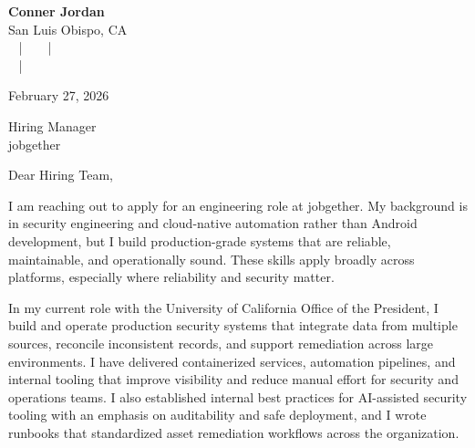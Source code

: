 \documentclass[letterpaper,11pt]{article}
\newcommand{\companyname}{jobgether}
\begin{document}
\begin{center}
  {\Huge \textbf{Conner Jordan}}\\[4pt]
  {\Large San Luis Obispo, CA}\\[4pt]
  \href{tel:+18059759793}{
    } ~ | ~
  \href{mailto:connercharlesjordan@gmail.com}{
    } ~ | ~
   \\
  \href{https://www.linkedin.com/in/conner-jordan-4b268514a/}{
    } ~ | ~
  \href{https://github.com/cjordan223}{
    }
\end{center}

\vspace{16pt}

\begin{flushright}
February 27, 2026
\end{flushright}

Hiring Manager\\
\companyname

\vspace{26pt}

\noindent
Dear Hiring Team,

\vspace{16pt}

I am reaching out to apply for an engineering role at \companyname. My background is in security engineering and cloud-native automation rather than Android development, but I build production-grade systems that are reliable, maintainable, and operationally sound. These skills apply broadly across platforms, especially where reliability and security matter.

\vspace{16pt}

In my current role with the University of California Office of the President, I build and operate production security systems that integrate data from multiple sources, reconcile inconsistent records, and support remediation across large environments. I have delivered containerized services, automation pipelines, and internal tooling that improve visibility and reduce manual effort for security and operations teams. I also established internal best practices for AI-assisted security tooling with an emphasis on auditability and safe deployment, and I wrote runbooks that standardized asset remediation workflows across the organization.
\end{document}
